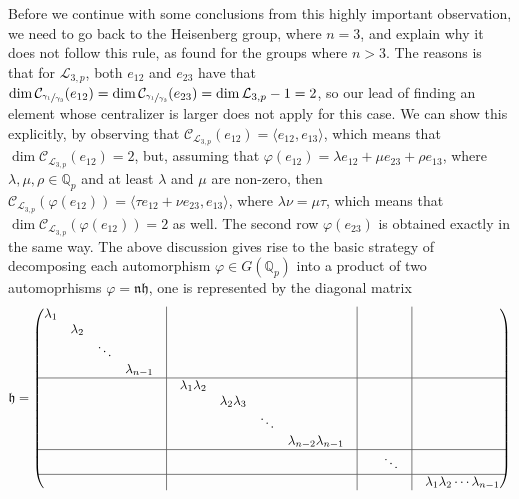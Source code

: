\documentclass[12pt]{article}
\begin{document}
Before we continue with some conclusions from this highly important observation, we need to go back to the Heisenberg group, where $n=3$, and explain why it does not follow this rule, as found for the groups where $n>3$. The reasons is that for $\mathcal{L}_{3,p}$, both $e_{12}$ and $e_{23}$ have that $\dim\mathcal{C}_{\sfrac{\gamma_1}{\gamma_3}}(e_{12})=\dim\mathcal{C}_{\sfrac{\gamma_1}{\gamma_3}}(e_{23})=\dim\mathcal{L}_{3,p}-1=2$, so our lead of finding an element whose centralizer is larger does not apply for this case. We can show this explicitly, by observing that $\mathcal{C}_{\mathcal{L}_{3,p}}(e_{12})=\langle e_{12},e_{13}\rangle$, which means that $\dim\mathcal{C}_{\mathcal{L}_{3,p}}(e_{12})=2$, but, assuming that $\varphi(e_{12})=\lambda e_{12}+\mu e_{23}+\rho e_{13}$, where $\lambda,\mu,\rho\in\mathbb{Q}_p$ and at least $\lambda$ and $\mu$ are non-zero, then $\mathcal{C}_{\mathcal{L}_{3,p}}(\varphi(e_{12}))=\langle \tau e_{12}+\nu e_{23},e_{13} \rangle$, where $\lambda\nu=\mu\tau$, which means that $\dim\mathcal{C}_{\mathcal{L}_{3,p}}(\varphi(e_{12}))=2$ as well. The second row $\varphi(e_{23})$ is obtained exactly in the same way.
The above discussion gives rise to the basic strategy of decomposing each automorphism $\varphi\in G(\mathbb{Q}_p)$ into a product of two automoprhisms $\varphi=\mathfrak{nh}$, one is represented by the diagonal matrix\[\mathfrak{h}=\begin{pmatrix}
\begin{matrix}\lambda_1 & & &\\
& \lambda_2 & &\\
& & \ddots &\\
& & & \lambda_{n-1}\\
\end{matrix} & \vline & &\vline &  &  & \vline&\\
\hline
 & \vline & \begin{matrix}\lambda_1\lambda_2 & & &\\
& \lambda_2\lambda_3 & &\\
& & \ddots &\\
& & & \lambda_{n-2}\lambda_{n-1}\\
\end{matrix}&\vline &  & &\vline& \\
\hline
 & \vline & &\vline &  & \ddots &\vline& \\
\hline
 & \vline &  &\vline &  &  &\vline& \lambda_1\lambda_2\cdots\lambda_{n-1}\\
\end{pmatrix}
\]
\end{document}

